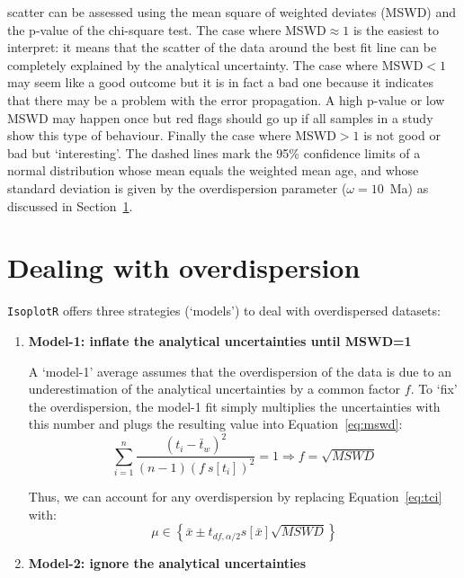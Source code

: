 \begin{refsection}
\begin{minipage}[t]{.58\textwidth}
{    scatter can be assessed using the mean square of weighted deviates
    (MSWD) and the p-value of the chi-square test. The case where
    MSWD$\approx{1}$ is the easiest to interpret: it means that the
    scatter of the data around the best fit line can be completely
    explained by the analytical uncertainty. The case where MSWD$<{1}$
    may seem like a good outcome but it is in fact a bad one because
    it indicates that there may be a problem with the error
    propagation. A high p-value or low MSWD may happen once but red
    flags should go up if all samples in a study show this type of
    behaviour. Finally the case where MSWD$>{1}$ is not good or bad
    but `interesting'. The dashed lines mark the 95\% confidence
    limits of a normal distribution whose mean equals the weighted
    mean age, and whose standard deviation is given by the
    overdispersion parameter ($\omega=10$~Ma) as discussed in
    Section~\ref{sec:overdispersion}.}
  \label{fig:wtdmeanMSWD}
\end{minipage}

\section{Dealing with overdispersion}
\label{sec:overdispersion}

\texttt{IsoplotR} offers three strategies (`models') to deal with
overdispersed datasets:

\begin{enumerate}
\item\textbf{Model-1: inflate the analytical uncertainties until MSWD=1}

  A `model-1' average assumes that the overdispersion of the data is due
  to an underestimation of the analytical uncertainties by a common
  factor $f$. To `fix' the overdispersion, the model-1 fit simply
  multiplies the uncertainties with this number and plugs the resulting
  value into Equation~\ref{eq:mswd}:
  \[
  \sum\limits_{i=1}^{n}\frac{(t_i-\bar{t}_w)^2}{(n-1) (f~s[t_i])^2} = 1
  \Rightarrow f = \sqrt{MSWD}
  \]

  Thus, we can account for any overdispersion by replacing
  Equation~\ref{eq:tci} with:
  \begin{equation}
    \mu \in \left\{\bar{x} \pm t_{df,\alpha/2} s[\bar{x}] \sqrt{MSWD} \right\}
    \label{eq:tci2}
  \end{equation}

\item\textbf{Model-2: ignore the analytical uncertainties}
  

\end{enumerate}
\end{refsection}
